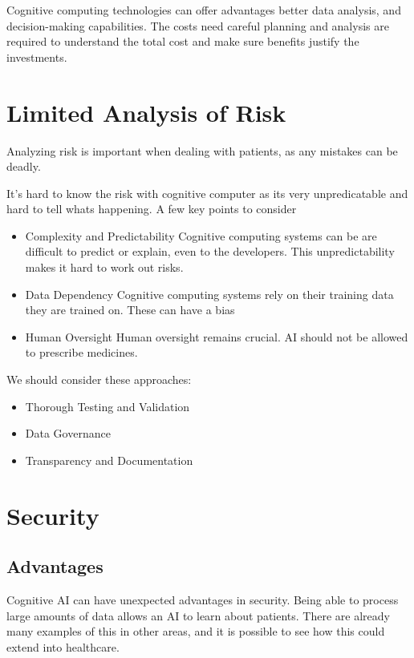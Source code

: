 \documentclass{article}
\begin{document}
Cognitive computing technologies can offer advantages better data analysis, and decision-making capabilities. The costs need careful planning and analysis are required to understand the total cost and make sure benefits justify the investments.

\section{Limited Analysis of Risk}
Analyzing risk is important when dealing with patients, as any mistakes can be deadly.

It's hard to know the risk with cognitive computer as its very unpredicatable and hard to tell whats happening. A few key points to consider 

\begin{itemize}
	\item Complexity and Predictability Cognitive computing systems can be are difficult to predict or explain, even to the developers. This unpredictability makes it hard to work out risks.
	\item Data Dependency Cognitive computing systems rely on their training data they are trained on. These can have a bias
	\item Human Oversight Human oversight remains crucial. AI should not be allowed to prescribe medicines.
\end{itemize}

We should consider these approaches:
\begin{itemize}
	\item Thorough Testing and Validation
	\item Data Governance
	\item Transparency and Documentation
\end{itemize}

\section{Security}
\subsection{Advantages}
Cognitive AI can have unexpected advantages in security. Being able to process large amounts of data allows an AI to learn about patients. There are already many examples of this \cite{security} in other areas, and it is possible to see how this could extend into healthcare.
\end{document}
